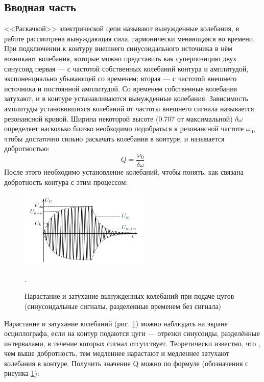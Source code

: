 \documentclass[a4paper,12pt]{article} %
\begin{document}
\subsection*{Вводная часть}
<<Раскачкой>> электрической цепи называют вынужденные колебания, в работе рассмотрена вынуждающая сила, гармонически меняющаяся во времени. При подключении к контуру внешнего синусоидального источника в
нём возникают колебания, которые можно представить как суперпозицию
двух синусоид \cite{labnik} первая — с частотой собственных колебаний
контура и амплитудой, экспоненциально убывающей со временем; вторая
— с частотой внешнего источника и постоянной амплитудой. Со временем
собственные колебания затухают, и в контуре устанавливаются
вынужденные колебания. Зависимость амплитуды установившихся
колебаний от частоты внешнего сигнала называется резонансной
кривой. Ширина некоторой высоте (0.707 от максимальной) $\delta \omega$ определяет насколько близко необходимо подобраться к резонансной частоте $\omega_0$, чтобы достаточно сильно раскачать колебания в контуре, и называется добротностью:
\begin{equation}
\label{кривые}
Q=\frac{\omega_0}{\delta \omega}
\end{equation}
После этого необходимо установление колебаний, чтобы понять, как связана добротность контура с этим процессом:
\begin{figure}[h!]
\begin{center}
\includegraphics[width=0.55\textwidth]{затухание}
\caption{Нарастание и затухание вынужденных колебаний при подаче цугов (синусоидальные сигналы, разделенные временем без сигнала)} \label{затухание}.
\end{center}
\end{figure} 
Нарастание и затухание колебаний (рис. \ref{затухание}) можно наблюдать на
экране осциллографа, если на контур подаются цуги — отрезки синусоиды,
разделённые интервалами, в течение которых сигнал отсутствует. Теоретически известно, что \cite{labnik}, чем выше добротность, тем медленнее нарастают и медленнее затухают колебания в контуре. Получить значение Q можно по формуле \cite{labnik} (обозначения с рисунка \ref{затухание}):
\end{document}
